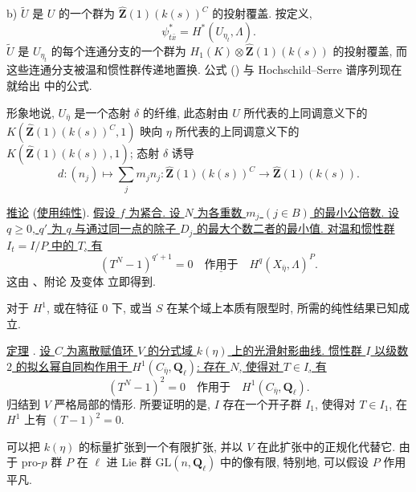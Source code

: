 b) $\widetilde U$ 是 $U$ 的一个群为 $\widehat{\mathbf Z}(1)(k(s))^C$ 的投射覆盖. 按定义,
\[
\psi^*_{t\bar x}=H^*(U_{\eta_t},\Lambda).
\]
$\widetilde U$ 是 $U_{\eta_t}$ 的每个连通分支的一个群为 $H_1(K)\otimes\widehat{\mathbf Z}(1)(k(s))$ 的投射覆盖, 而这些连通分支被温和惯性群传递地置换. 公式 () 与 Hochschild--Serre 谱序列现在就给出  中的公式.

形象地说, $U_{\bar\eta}$ 是一个态射 $\delta$ 的纤维, 此态射由 $U$ 所代表的上同调意义下的 $K(\widehat{\mathbf Z}(1)(k(s))^C,1)$ 映向 $\eta$ 所代表的上同调意义下的 $K(\widehat{\mathbf Z}(1)(k(s)),1)$; 态射 $\delta$ 诱导
\[
d:(n_j)\longmapsto\sum_jm_jn_j:
\widehat{\mathbf Z}(1)(k(s))^C
\longrightarrow\widehat{\mathbf Z}(1)(k(s)).
\]

\underline{推论}  (\underline{使用纯性}). \underline{假设 $f$ 为紧合. 设 $N$ 为各重数 $m_j$ $(j\in B)$ 的最小公倍数. 设 $q\geqslant0$, $q'$ 为 $q$ 与通过同一点的除子 $D_j$ 的最大个数二者的最小值. 对温和惯性群 $I_t=I/P$ 中的 $T$, 有}
\begin{equation*}
(T^N-1)^{q'+1}=0
\quad\underline{\text{作用于}}\quad
H^q(X_{\bar\eta},\Lambda)^P.
\end{equation*}
这由 、附论  及变体  立即得到.

对于 $H^1$, 或在特征 $0$ 下, 或当 $S$ 在某个域上本质有限型时, 所需的纯性结果已知成立.

\underline{定理} . \underline{设 $C$ 为离散赋值环 $V$ 的分式域 $k(\eta)$ 上的光滑射影曲线. 惯性群 $I$ 以级数 $2$ 的拟幺幂自同构作用于 $H^1(C_{\bar\eta},\mathbf Q_\ell)$: 存在 $N$, 使得对 $T\in I$, 有}
\begin{equation*}
(T^N-1)^2=0
\quad\text{作用于}\quad H^1(C_{\bar\eta},\mathbf Q_\ell).
\end{equation*}
归结到 $V$ 严格局部的情形. 所要证明的是, $I$ 存在一个开子群 $I_1$, 使得对 $T\in I_1$, 在 $H^1$ 上有 $(T-1)^2=0$.


可以把 $k(\eta)$ 的标量扩张到一个有限扩张, 并以 $V$ 在此扩张中的正规化代替它. 由于 pro-$p$ 群 $P$ 在 $\ell$ 进 Lie 群 $\mathrm{GL}(n,\mathbf Q_\ell)$ 中的像有限, 特别地, 可以假设 $P$ 作用平凡.


